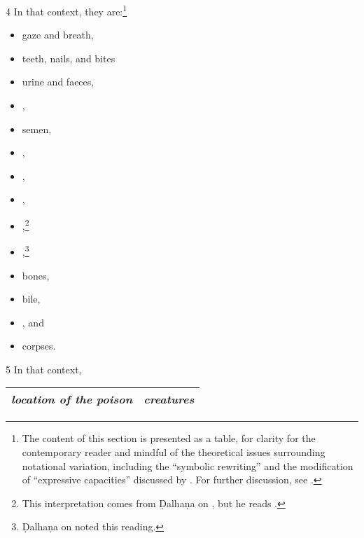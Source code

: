 \begin{translation}
 \item[4] In that context, they are:\footnote{The content of this section is
    presented as a table, for clarity for the contemporary reader and mindful of the
    theoretical issues surrounding notational variation, including the “symbolic
    rewriting” and the modification of “expressive capacities” discussed by
    \citet[321\,ff]{saru-2016}.  For further discussion, see
    \cite[81--83]{wuja-2021}.}
 \begin{multicols}{2}
 \begin{itemize}
     \item gaze and breath,
     \item teeth, nails, and bites
     \item  urine and faeces,
     \item {},
     \item semen,
     \item {}, %
     \item {}, %
     \item {},
     \item {},\footnote{This interpretation comes from
     Ḍalhaṇa on , but he reads .}
     \item {},\footnote{Ḍalhaṇa on  noted this reading.}
     \item bones,
     \item bile,
     \item {},
and 
     \item corpses.
     \end{itemize}
    \end{multicols}
\item[5] 
In that context,


{\centering
\begin{longtable}{
        >{\raggedright\arraybackslash}p{}
        >{\raggedright\arraybackslash}p{}}
\toprule
\emph{location of the poison} & \emph{creatures}\footnotemark\\
\midrule    
\endfirsthead


\end{longtable}}
\end{translation}
